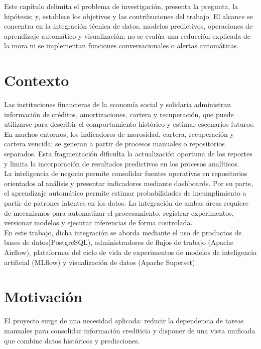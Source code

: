 Este capítulo delimita el problema de investigación, presenta la pregunta, la hipótesis; y, establece los objetivos y las contribuciones del trabajo. El alcance se concentra en la integración técnica de datos, modelos predictivos, operaciones de aprendizaje automático y visualización; no se evalúa una reducción explicada de la mora ni se implementan funciones conversacionales o alertas automáticas.

\section{Contexto}

Las instituciones financieras de la economía social y solidaria administran información de créditos, amortizaciones, cartera y recuperación, que puede utilizarse para describir el comportamiento histórico y estimar escenarios futuros. En muchos entornos, los indicadores de morosidad, cartera, recuperación y cartera vencida; se generan a partir de procesos manuales o repositorios separados. Esta fragmentación dificulta la actualización oportuna de los reportes y limita la incorporación de resultados predictivos en los procesos analíticos.\\

La inteligencia de negocio permite consolidar fuentes operativas en repositorios orientados al análisis y presentar indicadores mediante dashboards. Por su parte, el aprendizaje automático permite estimar probabilidades de incumplimiento a partir de patrones latentes en los datos. La integración de ambas áreas requiere de mecanismos para automatizar el procesamiento, registrar experimentos, versionar modelos y ejecutar inferencias de forma controlada.\\

En este trabajo, dicha integración se aborda mediante el uso de productos de bases de datos(PostgreSQL), administradores de flujos de trabajo (Apache Airflow), plataformas del ciclo de vida de experimentos de modelos de inteligencia artificial (MLflow) y visualización de datos (Apache Superset).

\section{Motivación}

El proyecto surge de una necesidad aplicada: reducir la dependencia de tareas manuales para consolidar información crediticia y disponer de una vista unificada que combine datos históricos y predicciones.\\

